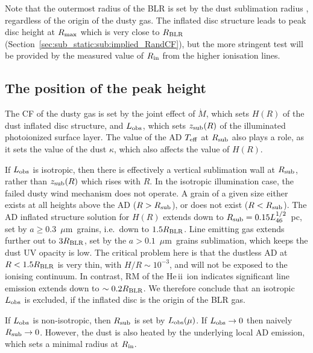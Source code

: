 \documentclass[a4paper,fleqn,usenatbib]{mnras}
\newcommand{\mdot}{\dot{M}}
\newcommand{\mic}{\mbox{$\mu$m}}
\newcommand{\HeII}{\mbox{He\,{\sc ii}}}
\begin{document}
Note that the outermost radius of the BLR is set by the dust sublimation radius \citep{NetzerLaor93},
regardless of the origin of the dusty gas. The inflated disc structure leads to peak disc height
at $R_{\rm max}$ which is very close to $R_{\rm BLR}$ (Section~\ref{sec:sub_static:sub:implied_RandCF}),
but the more stringent test will be provided by the measured value of $R_{\rm in}$ from the higher ionisation lines.


\subsection{The position of the peak height}

The CF of the dusty gas is set by the joint effect of $\mdot$, which sets $H(R)$
of the dust inflated disc structure, and $L_{\rm obs}$, which sets $z_{\rm sub}(R)$ of 
the illuminated photoionized surface layer.
The value of the AD $T_{\rm eff}$ at $R_{\rm sub}$ also plays a role, as it sets the 
value of the dust $\kappa$, which also affects the value of $H(R)$.

If $L_{\rm obs}$ is isotropic, then there is effectively a vertical sublimation wall
at $R_{\rm sub}$, rather than $z_{\rm sub}(R)$ which rises with $R$.
In the isotropic illumination case, the failed dusty wind mechanism does not operate. A grain of a given size either exists at all 
heights above the AD ($R>R_{\rm sub}$), or does not exist ($R<R_{\rm sub}$). 
The AD inflated structure solution for $H(R)$ extends down to $R_{\rm sub}=0.15L_{46}^{1/2}$~pc, set by 
$a\ge 0.3$~\mic\ grains, i.e.\ down to $1.5R_{\rm BLR}$. Line emitting gas extends further out to 
$3R_{\rm BLR}$, set by the $a>0.1$~\mic\ grains sublimation, which keeps the dust UV opacity is low. 
The critical problem here is that the dustless AD at $R<1.5R_{\rm BLR}$ is very thin, 
with $H/R\sim 10^{-3}$, and will not be exposed to the ionising continuum. 
In contrast, RM of the \HeII\ ion indicates significant line emission extends down 
to $\sim 0.2R_{\rm BLR}$. We therefore conclude that an isotropic $L_{\rm obs}$ is excluded,
if the inflated disc is the origin of the BLR gas.

If $L_{\rm obs}$ is non-isotropic, then $R_{\rm sub}$ is set by $L_{\rm obs}(\mu)$. If $L_{\rm obs}\rightarrow 0$ then naively $R_{\rm sub}\rightarrow 0$. 
However, the dust is also heated by the underlying local AD emission, which sets a minimal radius
at $R_{\rm in}$.
 
\end{document}
